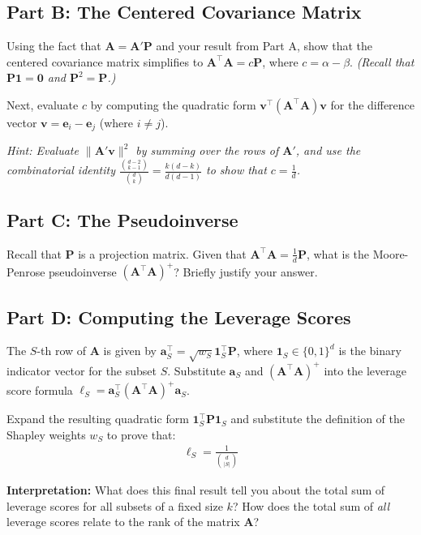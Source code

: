 \documentclass{article}
\begin{document}
\hypertarget{part-b-the-centered-covariance-matrix}{%
\subsection*{Part B: The Centered Covariance Matrix}\label{part-b-the-centered-covariance-matrix}}

Using the fact that \(\mathbf{A} = \mathbf{A}' \mathbf{P}\) and your result from Part A, show that the centered covariance matrix simplifies to \(\mathbf{A}^\top \mathbf{A} = c \mathbf{P}\), where \(c = \alpha - \beta\). \emph{(Recall that \(\mathbf{P} \mathbf{1} = \mathbf{0}\) and \(\mathbf{P}^2 = \mathbf{P}\).)}

Next, evaluate \(c\) by computing the quadratic form \(\mathbf{v}^\top (\mathbf{A}^\top \mathbf{A}) \mathbf{v}\) for the difference vector \(\mathbf{v} = \mathbf{e}_i - \mathbf{e}_j\) (where \(i \neq j\)).

\emph{Hint: Evaluate \(\|\mathbf{A}' \mathbf{v}\|^2\) by summing over the rows of \(\mathbf{A}'\), and use the combinatorial identity \(\frac{\binom{d-2}{k-1}}{\binom{d}{k}} = \frac{k(d-k)}{d(d-1)}\) to show that \(c = \frac{1}{d}\).}

\hypertarget{part-c-the-pseudoinverse}{%
\subsection*{Part C: The Pseudoinverse}\label{part-c-the-pseudoinverse}}

Recall that \(\mathbf{P}\) is a projection matrix. Given that \(\mathbf{A}^\top \mathbf{A} = \frac{1}{d} \mathbf{P}\), what is the Moore-Penrose pseudoinverse \((\mathbf{A}^\top \mathbf{A})^+\)? Briefly justify your answer.

\hypertarget{part-d-computing-the-leverage-scores}{%
\subsection*{Part D: Computing the Leverage Scores}\label{part-d-computing-the-leverage-scores}}

The \(S\)-th row of \(\mathbf{A}\) is given by \(\mathbf{a}_S^\top = \sqrt{w_S} \mathbf{1}_S^\top \mathbf{P}\), where \(\mathbf{1}_S \in \{0,1\}^d\) is the binary indicator vector for the subset \(S\). Substitute \(\mathbf{a}_S\) and \((\mathbf{A}^\top \mathbf{A})^+\) into the leverage score formula \(\ell_S = \mathbf{a}_S^\top (\mathbf{A}^\top \mathbf{A})^+ \mathbf{a}_S\).

Expand the resulting quadratic form \(\mathbf{1}_S^\top \mathbf{P} \mathbf{1}_S\) and substitute the definition of the Shapley weights \(w_S\) to prove that: \begin{align*}
\ell_S = \frac{1}{\binom{d}{|S|}}
\end{align*}

\textbf{Interpretation:} What does this final result tell you about the total sum of leverage scores for all subsets of a fixed size \(k\)? How does the total sum of \emph{all} leverage scores relate to the rank of the matrix \(\mathbf{A}\)?
\end{document}
